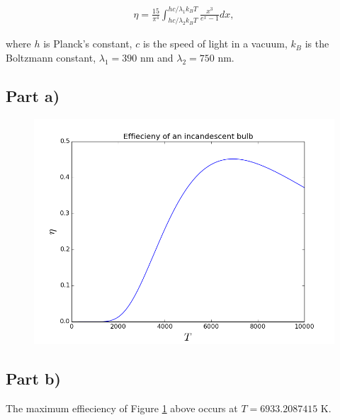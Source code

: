 \documentclass[a4paper,12pt]{article}
\begin{document}
\begin{eqnarray}
\eta = \frac{15}{\pi^4}\int_{hc/\lambda_2 k_B T}^{hc/\lambda_1 k_B T} \frac{x^3}{e^x - 1} dx,\nonumber
\end{eqnarray}

where $h$ is Planck's constant, $c$ is the speed of light in a vacuum, $k_B$ is the Boltzmann constant, $\lambda_1 = 390$ nm and $\lambda_2 = 750$ nm.

\subsection{Part a)}

\begin{figure}[H]
\centering
\includegraphics[width = \linewidth]{lab4q6a.png}
\caption{}
\label{fig:q6}
\end{figure}

\subsection{Part b)}

The maximum effieciency of Figure \ref{fig:q6} above occurs at $T = 6933.2087415$ K.
\end{document}
